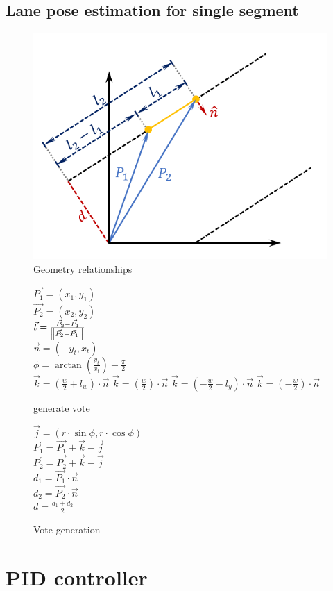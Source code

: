 \documentclass{article}
\begin{document}
\subsection{Lane pose estimation for single segment}
\begin{figure} [ht]
  \centering\includegraphics[scale=0.9]{pose_explain.png}
  \caption{Geometry relationships}
\end{figure}

\begin{figure} [ht]
\begin{algorithm}[H]
	$\vec{P_1} = (x_1, y_1)$
	\\
	$\vec{P_2} = (x_2, y_2)$
	\\
	$\vec{t} = \frac{\vec{P_2} - \vec{P_1}}
					{\norm{\vec{P_2} - \vec{P_1}}}$
	\\
	$\vec{n} = (-y_t, x_t)$
	\\
	$\phi = \arctan(\frac{y_t}{x_t}) - \frac{\pi}{2}$
	\\
		{
			{
				$\vec{k} = (\frac{w}{2} + l_w) \cdot \vec{n}$
			}
			{
				$\vec{k} = (\frac{w}{2}) \cdot \vec{n}$
			}
		}
		{
			{
				$\vec{k} = (-\frac{w}{2} - l_y) \cdot \vec{n}$
			}
			{
				$\vec{k} = (-\frac{w}{2}) \cdot \vec{n}$
			}
		}
	\caption{generate vote}
	$\vec{j} = (r \cdot \sin\phi, r \cdot \cos\phi)$
	\\
	$P_1^\prime = \vec{P_1} + \vec{k} - \vec{j}$
	\\
	$P_2^\prime = \vec{P_2} + \vec{k} - \vec{j}$
	\\
	$d_1 = \vec{P_1} \cdot \vec{n}$
	\\
	$d_2 = \vec{P_2} \cdot \vec{n}$
	\\
	$d = \frac{d_1 + d_2}{2}$
\end{algorithm}
\caption{Vote generation}
\end{figure}

\section{PID controller}
\end{document}
